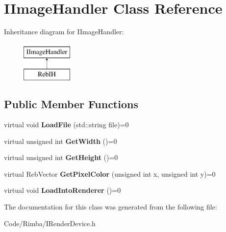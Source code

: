 \hypertarget{class_i_image_handler}{}\section{I\+Image\+Handler Class Reference}
\label{class_i_image_handler}
Inheritance diagram for I\+Image\+Handler\+:\begin{figure}[H]
\begin{center}
\leavevmode
\includegraphics[height=2.000000cm]{class_i_image_handler}
\end{center}
\end{figure}
\subsection*{Public Member Functions}
\begin{DoxyCompactItemize}
\item 
virtual void {\bfseries Load\+File} (std\+::string file)=0\hypertarget{class_i_image_handler_a823b11871d4fcc40e8e18a94820d0b4f}{}\label{class_i_image_handler_a823b11871d4fcc40e8e18a94820d0b4f}

\item 
virtual unsigned int {\bfseries Get\+Width} ()=0\hypertarget{class_i_image_handler_a662c52ad92e02fe21a7d55988cbaa25b}{}\label{class_i_image_handler_a662c52ad92e02fe21a7d55988cbaa25b}

\item 
virtual unsigned int {\bfseries Get\+Height} ()=0\hypertarget{class_i_image_handler_aaaee578873610c53daf1222b583fd0c1}{}\label{class_i_image_handler_aaaee578873610c53daf1222b583fd0c1}

\item 
virtual Reb\+Vector {\bfseries Get\+Pixel\+Color} (unsigned int x, unsigned int y)=0\hypertarget{class_i_image_handler_abc699356ff81d184e3094685d819cb74}{}\label{class_i_image_handler_abc699356ff81d184e3094685d819cb74}

\item 
virtual void {\bfseries Load\+Into\+Renderer} ()=0\hypertarget{class_i_image_handler_a88de4b52867448c3928e1a2c461e5e15}{}\label{class_i_image_handler_a88de4b52867448c3928e1a2c461e5e15}

\end{DoxyCompactItemize}


The documentation for this class was generated from the following file\+:\begin{DoxyCompactItemize}
\item 
Code/\+Rimba/I\+Render\+Device.\+h\end{DoxyCompactItemize}
